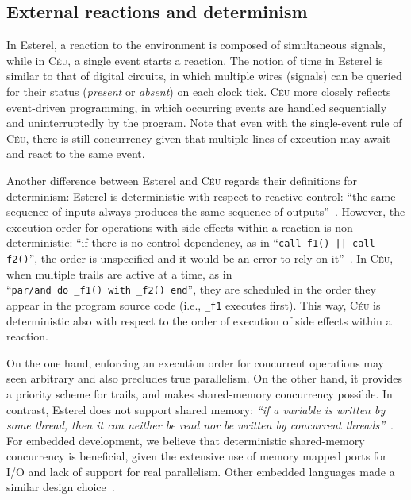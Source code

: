 \documentclass{acm_proc_article-sp}
\newcommand{\CEU}{\textsc{C\'{e}u}\xspace}
\newcommand{\code}[1] {{\small{\texttt{#1}}}}
\newcommand{\1}{\;}
\newcommand{\2}{\;\;}
\newcommand{\3}{\;\;\;}
\newcommand{\5}{\;\;\;\;\;}
\begin{document}
\subsection{External reactions and determinism}
\label{sec.ceu.det}

In Esterel, a reaction to the environment is composed of simultaneous signals, 
while in \CEU, a single event starts a reaction.
%
The notion of time in Esterel is similar to that of digital circuits, in which 
multiple wires (signals) can be queried for their status (\emph{present} or 
\emph{absent}) on each clock tick.
%
\CEU more closely reflects event-driven programming, in which occurring events 
are handled sequentially and uninterruptedly by the program.
%
Note that even with the single-event rule of \CEU, there is still concurrency 
given that multiple lines of execution may await and react to the same event.

Another difference between Esterel and \CEU regards their definitions for 
determinism:
%
Esterel is deterministic with respect to reactive control: ``the same sequence 
of inputs always produces the same sequence of outputs''~\cite{esterel.primer}.
However, the execution order for operations with side-effects within a reaction 
is non-deterministic: ``if there is no control dependency, as in ``\code{call 
f1() || call f2()}'', the order is unspecified and it would be an error to rely 
on it''~\cite{esterel.primer}.
%
In \CEU, when multiple trails are active at a time, as in
``\code{par/and~do~\_f1()~with~\_f2()~end}'', they are scheduled in the order 
they appear in the program source code (i.e., \code{\_f1} executes first).
%
This way, \CEU is deterministic also with respect to the order of execution of 
side effects within a reaction.

On the one hand, enforcing an execution order for concurrent operations may 
seen arbitrary and also precludes true parallelism.
On the other hand, it provides a priority scheme for trails, and makes 
shared-memory concurrency possible.
In contrast, Esterel does not support shared memory: \emph{``if a variable is 
written by some thread, then it can neither be read nor be written by 
concurrent threads''}~\cite{esterel.primer}.
%
For embedded development, we believe that deterministic shared-memory 
concurrency is beneficial, given the extensive use of memory mapped ports for 
I/O and lack of support for real parallelism.
Other embedded languages made a similar design choice~\cite{wsn.sol,pret}.
\end{document}
